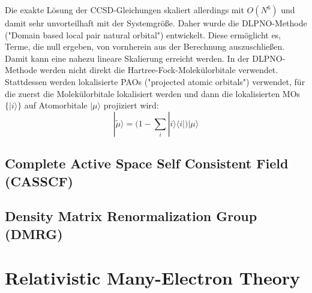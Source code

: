 \documentclass[9pt]{report}
\begin{document}
Die exakte Lösung der CCSD-Gleichungen skaliert allerdings mit $O(N^6)$ und damit sehr unvorteilhaft mit der Systemgröße. Daher wurde die DLPNO-Methode ("Domain based local pair natural orbital") entwickelt. Diese ermöglicht es, Terme, die null ergeben, von vornherein aus der Berechnung auszuschließen. Damit kann eine nahezu lineare Skalierung erreicht werden. In der DLPNO-Methode werden nicht direkt die Hartree-Fock-Molekülorbitale verwendet. Stattdessen werden lokalisierte PAOs ("projected atomic orbitals") verwendet, für die zuerst die Molekülorbitale lokalisiert werden und dann die lokalisierten MOs $\{|i\rangle\}$ auf Atomorbitale $|\mu\rangle$ projiziert wird:
\begin{equation}
|\tilde{\mu}\rangle = \Big(1-\sum_{i}|i\rangle\langle i|\Big)|\mu\rangle
\end{equation}









\section{Complete Active Space Self Consistent Field (CASSCF)}



\section{Density Matrix Renormalization Group (DMRG)}










































\chapter{Relativistic Many-Electron Theory}
\end{document}
